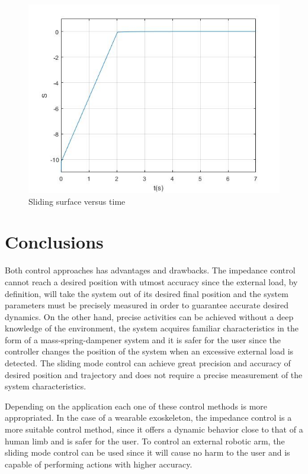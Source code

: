   \begin{figure}[thpb]
      \centering
      \includegraphics[scale=0.5]{Images/Sliding_mode_S.jpg}
      \caption{Sliding surface versus time}
      \label{slidingSurface}
   \end{figure}

\section{Conclusions}

Both control approaches has advantages and drawbacks. The impedance control cannot reach a desired position with utmost accuracy since the external load, by definition, will take the system out of its desired final position and the system parameters must be precisely measured in order to guarantee accurate desired dynamics. On the other hand, precise activities can be achieved without a deep knowledge of the environment, the system acquires familiar characteristics in the form of a mass-spring-dampener system and it is safer for the user since the controller changes the position of the system when an excessive external load is detected. The sliding mode control can achieve great precision and accuracy of desired position and trajectory and does not require a precise measurement of the system characteristics.

Depending on the application each one of these control methods is more appropriated. In the case of a wearable exoskeleton, the impedance control is a more suitable control method, since it offers a dynamic behavior close to that of a human limb and is safer for the user. To control an external robotic arm, the sliding mode control can be used since it will cause no harm to the user and is capable of performing actions with higher accuracy.